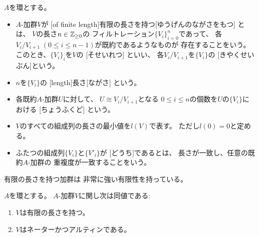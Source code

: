 \documentclass[report]{jlreq}
\begin{document}
\begin{definition}
    $A$を環とする。
    \begin{itemize}
        \item $A$-加群$V$が
            [of finite length]{有限の長さを持つ}[ゆうげんのながさをもつ]
            とは、
            $V$の長さ$n \in \mathbb{Z}_{\ge 0}$の
            フィルトレーション$\{ V_i \}_{i = 0}^n$であって、
            各$V_i / V_{i + 1} \; (0 \le i \le n - 1)$が既約であるようなものが
            存在することをいう。
            このとき、$\{ V_i \}_i$を$V$の
            [そせいれつ]
            といい、
            各$V_i / V_{i + 1}$を$\{ V_i \}$の
            [きやくせいぶん]という。
        \item $n$を$\{ V_i \}$の
            [length]{長さ}[ながさ]
            という。
        \item 各既約$A$-加群$U$に対して、
            $U \cong V_i / V_{i + 1}$となる
            $0 \le i \le n$の個数を$U$の$\{ V_i \}$における
            [ちょうふくど]
            という。
        \item $V$のすべての組成列の長さの最小値を$l(V)$で表す。
            ただし$l(0) = 0$と定める。
        \item ふたつの組成列$\{ V_i \}$と$\{ V'_i \}$が
            [どうち]であるとは、
            長さが一致し、任意の既約$A$-加群の
            重複度が一致することをいう。
    \end{itemize}
\end{definition}

有限の長さを持つ加群は
非常に強い有限性を持っている。

\begin{theorem}
    $A$を環とする。
    $A$-加群$V$に関し次は同値である:
    \begin{enumerate}
        \item $V$は有限の長さを持つ。
        \item $V$はネーターかつアルティンである。
    \end{enumerate}
\end{theorem}
\end{document}
